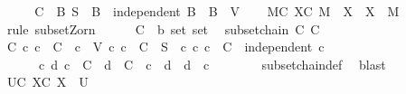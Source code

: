 \begin{isabellebody}
%
\isadelimproof
%
\endisadelimproof
%
\isatagproof
{}\isamarkupfalse%
\ {\isacharminus}{\kern0pt}\isanewline
\ \ \isamarkupfalse%
\ {\isacharquery}{\kern0pt}C\ {\isacharequal}{\kern0pt}\ {\isachardoublequoteopen}{\isacharbraceleft}{\kern0pt}B{\isachardot}{\kern0pt}\ S\ {\isasymsubseteq}\ B\ {\isasymand}\ independent\ B\ {\isasymand}\ B\ {\isasymsubseteq}\ V{\isacharbraceright}{\kern0pt}{\isachardoublequoteclose}\isanewline
\ \ \isamarkupfalse%
\ {\isachardoublequoteopen}{\isasymexists}M{\isasymin}{\isacharquery}{\kern0pt}C{\isachardot}{\kern0pt}\ {\isasymforall}X{\isasymin}{\isacharquery}{\kern0pt}C{\isachardot}{\kern0pt}\ M\ {\isasymsubseteq}\ X\ {\isasymlongrightarrow}\ X\ {\isacharequal}{\kern0pt}\ M{\isachardoublequoteclose}\isanewline
\ \ \isamarkupfalse%
\ {\isacharparenleft}{\kern0pt}rule\ subset{\isacharunderscore}{\kern0pt}Zorn{\isacharparenright}{\kern0pt}\isanewline
\ \ \ \ \isamarkupfalse%
\ C\ {\isacharcolon}{\kern0pt}{\isacharcolon}{\kern0pt}\ {\isachardoublequoteopen}{\isacharprime}{\kern0pt}b\ set\ set{\isachardoublequoteclose}\ \isamarkupfalse%
\ {\isachardoublequoteopen}subset{\isachardot}{\kern0pt}chain\ {\isacharquery}{\kern0pt}C\ C{\isachardoublequoteclose}\isanewline
\ \ \ \ \isamarkupfalse%
\ \isamarkupfalse%
\ C{\isacharcolon}{\kern0pt}\ {\isachardoublequoteopen}{\isasymAnd}c{\isachardot}{\kern0pt}\ c\ {\isasymin}\ C\ {\isasymLongrightarrow}\ c\ {\isasymsubseteq}\ V{\isachardoublequoteclose}\ {\isachardoublequoteopen}{\isasymAnd}c{\isachardot}{\kern0pt}\ c\ {\isasymin}\ C\ {\isasymLongrightarrow}\ S\ {\isasymsubseteq}\ c{\isachardoublequoteclose}\ {\isachardoublequoteopen}{\isasymAnd}c{\isachardot}{\kern0pt}\ c\ {\isasymin}\ C\ {\isasymLongrightarrow}\ independent\ c{\isachardoublequoteclose}\isanewline
\ \ \ \ \ \ {\isachardoublequoteopen}{\isasymAnd}c\ d{\isachardot}{\kern0pt}\ c\ {\isasymin}\ C\ {\isasymLongrightarrow}\ d\ {\isasymin}\ C\ {\isasymLongrightarrow}\ c\ {\isasymsubseteq}\ d\ {\isasymor}\ d\ {\isasymsubseteq}\ c{\isachardoublequoteclose}\isanewline
\ \ \ \ \ \ \isamarkupfalse%
\ subset{\isachardot}{\kern0pt}chain{\isacharunderscore}{\kern0pt}def\ \isamarkupfalse%
\ blast{\isacharplus}{\kern0pt}\isanewline
\isanewline
\ \ \ \ \isamarkupfalse%
\ {\isachardoublequoteopen}{\isasymexists}U{\isasymin}{\isacharquery}{\kern0pt}C{\isachardot}{\kern0pt}\ {\isasymforall}X{\isasymin}C{\isachardot}{\kern0pt}\ X\ {\isasymsubseteq}\ U{\isachardoublequoteclose}\isanewline

\end{isabellebody}
